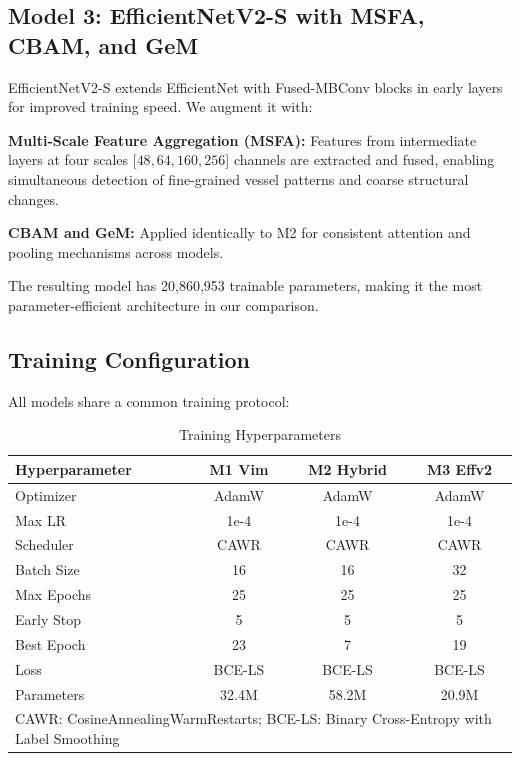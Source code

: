 \documentclass[conference]{IEEEtran}
\begin{document}
\subsection{Model 3: EfficientNetV2-S with MSFA, CBAM, and GeM}

EfficientNetV2-S extends EfficientNet with 
Fused-MBConv blocks in early layers for improved 
training speed. We augment it with:

\textbf{Multi-Scale Feature Aggregation (MSFA):} 
Features from intermediate layers at four scales 
[$48, 64, 160, 256$] channels are extracted 
and fused, enabling simultaneous detection of 
fine-grained vessel patterns and coarse structural 
changes.

\textbf{CBAM and GeM:} Applied identically to M2 
for consistent attention and pooling mechanisms 
across models.

The resulting model has 20,860,953 trainable parameters, 
making it the most parameter-efficient architecture 
in our comparison.

\subsection{Training Configuration}

All models share a common training protocol:

\begin{table}[htbp]
\caption{Training Hyperparameters}
\begin{center}
\begin{tabular}{lccc}
\toprule
\textbf{Hyperparameter} & \textbf{M1 Vim} & 
\textbf{M2 Hybrid} & \textbf{M3 Effv2} \\
\midrule
Optimizer      & AdamW  & AdamW  & AdamW  \\
Max LR         & 1e-4   & 1e-4   & 1e-4   \\
Scheduler      & CAWR   & CAWR   & CAWR   \\
Batch Size     & 16     & 16     & 32     \\
Max Epochs     & 25     & 25     & 25     \\
Early Stop     & 5      & 5      & 5      \\
Best Epoch     & 23     & 7      & 19     \\
Loss           & BCE-LS & BCE-LS & BCE-LS \\
Parameters     & 32.4M  & 58.2M  & 20.9M  \\
\bottomrule
\multicolumn{4}{l}{\small CAWR: CosineAnnealingWarmRestarts; BCE-LS: Binary Cross-Entropy with Label Smoothing}
\end{tabular}
\label{tab:training}
\end{center}
\end{table}
\end{document}
